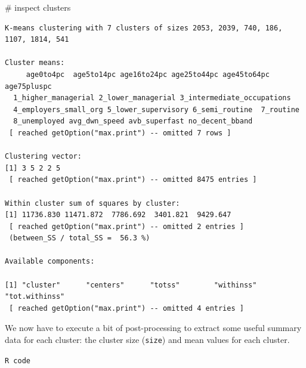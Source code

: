 \documentclass[
  letterpaper,
  DIV=11,
  numbers=noendperiod]{scrreprt}
\newenvironment{Shaded}{\begin{snugshade}}{\end{snugshade}}
\newcommand{\CommentTok}[1]{\textcolor[rgb]{0.37,0.37,0.37}{#1}}
\newcommand{\NormalTok}[1]{\textcolor[rgb]{0.00,0.23,0.31}{#1}}
\newcommand{\OtherTok}[1]{\textcolor[rgb]{0.00,0.23,0.31}{#1}}
\newcommand{\SpecialCharTok}[1]{\textcolor[rgb]{0.37,0.37,0.37}{#1}}
\begin{document}
\begin{Shaded}
\begin{Highlighting}[]
\CommentTok{\# inspect}
\NormalTok{clusters}
\end{Highlighting}
\end{Shaded}

\begin{verbatim}
K-means clustering with 7 clusters of sizes 2053, 2039, 740, 186, 1107, 1814, 541

Cluster means:
     age0to4pc  age5to14pc age16to24pc age25to44pc age45to64pc age75pluspc
  1_higher_managerial 2_lower_managerial 3_intermediate_occupations
  4_employers_small_org 5_lower_supervisory 6_semi_routine  7_routine
  8_unemployed avg_dwn_speed avb_superfast no_decent_bband
 [ reached getOption("max.print") -- omitted 7 rows ]

Clustering vector:
[1] 3 5 2 2 5
 [ reached getOption("max.print") -- omitted 8475 entries ]

Within cluster sum of squares by cluster:
[1] 11736.830 11471.872  7786.692  3401.821  9429.647
 [ reached getOption("max.print") -- omitted 2 entries ]
 (between_SS / total_SS =  56.3 %)

Available components:

[1] "cluster"      "centers"      "totss"        "withinss"     "tot.withinss"
 [ reached getOption("max.print") -- omitted 4 entries ]
\end{verbatim}

We now have to execute a bit of post-processing to extract some useful
summary data for each cluster: the cluster size (\texttt{size}) and mean
values for each cluster.

\begin{codelisting}

\caption{\texttt{R code}}

\begin{Shaded}
\end{Shaded}

\end{codelisting}
\end{document}
